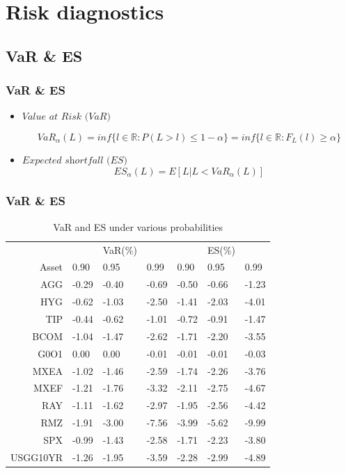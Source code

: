 \documentclass{beamer}
\newcommand\Fontviii{\fontsize{8}{9.2}\selectfont}
\begin{document}
\section{Risk diagnostics}
\subsection{VaR \& ES}

\begin{frame}
\frametitle{VaR \& ES}
\begin{itemize}
\item $\textit{Value at Risk (VaR)} $  

\begin{equation}
VaR_{\alpha}(L) = inf\{l \in \mathbb{R} : P(L > l) \leq 1-\alpha \} = 
inf\{l \in \mathbb{R} : F_L(l) \geq \alpha \}
\end{equation}
\item $\textit{Expected shortfall (ES)}$ 
\begin{equation}
ES_{\alpha}(L) = E\left[ L \vert L<VaR_{\alpha}(L) \right]
\end{equation}

\end{itemize}
\end{frame}


\begin{frame}
\frametitle{VaR \& ES}
\Fontviii
\begin{table}[!h]
\caption{VaR and ES under various probabilities} %
\centering 
\begin{tabular}{ | r || p{1cm} p{1cm} p{1cm} || p{1cm} p{1cm} p{1cm} | } 
 \hline
 & & VaR(\%) &&& ES(\%) & \\
Asset& 0.90 & 0.95 & 0.99 & 0.90 & 0.95 & 0.99 \\
  \hline \hline
AGG & -0.29 & -0.40 & -0.69 & -0.50 & -0.66 & -1.23\\ 
HYG & -0.62 & -1.03 & -2.50 & -1.41 & -2.03 & -4.01\\ 
TIP & -0.44 & -0.62 & -1.01 & -0.72 & -0.91 & -1.47\\ 
BCOM & -1.04 & -1.47 & -2.62 & -1.71 & -2.20 & -3.55\\ 
G0O1 &  0.00 &  0.00 & -0.01 & -0.01 & -0.01 & -0.03\\ 
MXEA & -1.02 & -1.46 & -2.59 & -1.74 & -2.26 & -3.76\\ 
MXEF & -1.21 & -1.76 & -3.32 & -2.11 & -2.75 & -4.67\\ 
RAY & -1.11 & -1.62 & -2.97 & -1.95 & -2.56 & -4.42\\ 
RMZ & -1.91 & -3.00 & -7.56 & -3.99 & -5.62 & -9.99\\ 
SPX & -0.99 & -1.43 & -2.58 & -1.71 & -2.23 & -3.80\\ 
USGG10YR & -1.26 & -1.95 & -3.59 & -2.28 & -2.99 & -4.89\\
 \hline
\end{tabular}
\label{table:VaRES}
\end{table}
\end{frame}
\end{document}

